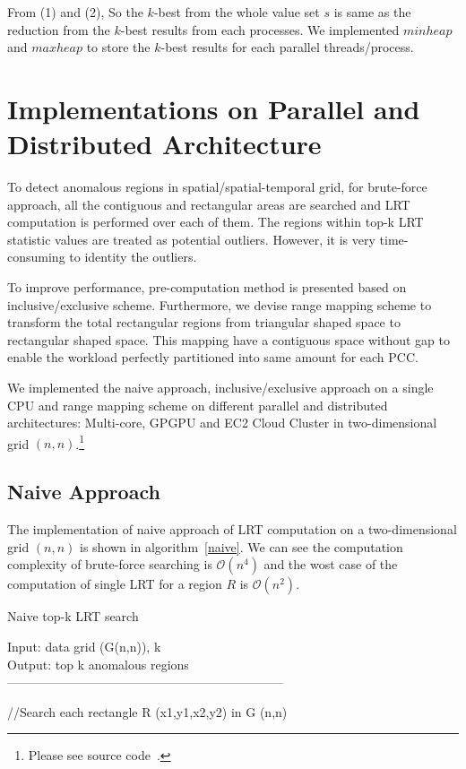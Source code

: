 \documentclass[AMA,LATO1COL]{WileyNJD-v2-bak}
\newcommand\bigo{\mathcal O}
\begin{document}
From (1) and (2), So the $k$-best from the whole value set $s$ is same as the reduction from the $k$-best results from each processes. We implemented $minheap$ and $maxheap$ to store the $k$-best results for each parallel threads/process.

\section {Implementations on Parallel and Distributed Architecture }\label{IMPDA}
To detect anomalous regions in spatial/spatial-temporal grid, for brute-force approach, all the contiguous and rectangular areas are searched and LRT computation is performed over each of them. The regions within top-k LRT statistic values are treated as potential outliers. However, it is very time-consuming to identity the outliers.

To improve performance, pre-computation method is presented based on inclusive/exclusive scheme. Furthermore, we devise range mapping scheme to transform the total rectangular regions from triangular shaped space to rectangular shaped space. This mapping have a contiguous space without gap to enable the workload perfectly partitioned into same amount for each PCC.

We implemented the naive approach, inclusive/exclusive approach on a single CPU and range mapping scheme on different parallel and distributed architectures: Multi-core, GPGPU and EC2 Cloud Cluster in two-dimensional grid $(n,n)$.\footnote{Please see source code~\cite{lrtsrc}.}

\subsection{Naive Approach}
The implementation of naive approach of LRT computation on a two-dimensional grid $(n,n)$ is shown in algorithm~\ref{naive}. We can see the computation complexity of brute-force searching is $\bigo(n^4)$ and the wost case of the computation of single LRT for a region $R$ is $\bigo(n^2)$.

\begin{algorithm}[t!]
\label{algobr1}
\caption{Naive top-k LRT search}\label{naive}
Input: data grid (G(n,n)), k\\
Output: top k anomalous regions\\
------------------------------------------------------------------ \\
\begin{algorithmic}[1]
\State //Search each rectangle R (x1,y1,x2,y2) in G (n,n)
\EndFor
\EndFor
\EndFor
\EndFor
{}
\end{algorithmic}
\end{algorithm}
\end{document}

